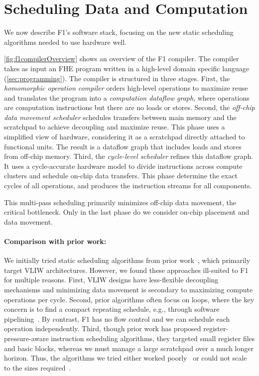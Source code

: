 \section{Scheduling Data and Computation}\label{sec:scheduler}

We now describe F1's software stack, focusing on the new static scheduling
algorithms needed to use hardware well.

\figFOneCompilerOverview

\autoref{fig:f1compilerOverview} shows an overview of the F1 compiler. The
compiler takes as input an FHE program written in a high-level domain specific
language (\autoref{sec:programming}). The compiler is structured in three
stages. First, the \emph{homomorphic operation compiler} orders high-level
operations to maximize reuse and translates the program into a
\emph{computation dataflow graph}, where operations are computation
instructions but there are no loads or stores. Second, the \emph{off-chip data
movement scheduler} schedules transfers between main memory and the scratchpad
to achieve decoupling and maximize reuse. This phase uses a simplified view of
hardware, considering it as a scratchpad directly attached to functional units.
The result is a dataflow graph that includes loads and stores from off-chip
memory. Third, the \emph{cycle-level scheduler} refines this dataflow graph. It
uses a cycle-accurate hardware model to divide instructions across compute
clusters and schedule on-chip data transfers. This phase determine the exact
cycles of all operations, and produces the instruction streams for all
components.

This multi-pass scheduling primarily minimizes off-chip data movement, the
critical bottleneck. Only in the last phase do we consider on-chip placement
and data movement.

\paragraph{Comparison with prior work:}
We initially tried static sched\-uling algorithms from prior
work~\cite{blelloch:acm1999:provably,marchal:jpdc2019:limiting,goodman:ics1988:code,ozer:micro1998:unified,barany:odes2011:register},
which primarily target VLIW architectures. However, we found these approaches
ill-suited to F1 for multiple reasons. First, VLIW designs have less-flexible
decoupling mechanisms and minimizing data movement is secondary to maximizing
compute operations per cycle. Second, prior algorithms often focus on loops,
where the key concern is to find a compact repeating schedule, e.g., through
software pipelining~\cite{lam1989software}. By contrast, F1 has no flow control
and we can schedule each operation independently. Third, though prior work has
proposed register-pressure-aware instruction scheduling algorithms, they
targeted small register files and basic blocks, whereas we must manage a large
scratchpad over a much longer horizon. Thus, the algorithms we tried either
worked poorly~\cite{ozer:micro1998:unified, goodman:ics1988:code,
marchal:jpdc2019:limiting} or could not scale to the sizes
required~\cite{barany:odes2011:register, xu:sigplan2007:tetris,
touati:ijpp2005:register, berson:pact1993:ursa}.

